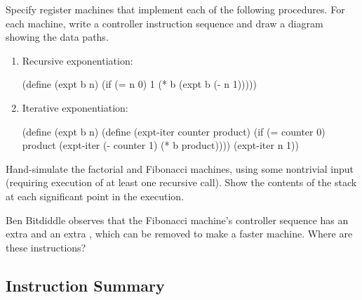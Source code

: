 \begin{exercise}
	\label{Exercise 5.4}
	Specify register machines that implement each of the following procedures.
	For each machine, write a controller instruction sequence and draw a diagram showing the data paths.
	\begin{enumerate}[label = \alph*., leftmargin = *]

		\item
			Recursive exponentiation:

			\begin{scheme}
			  (define (expt b n)
			    (if (= n 0)
			        1
			        (* b (expt b (- n 1)))))
			\end{scheme}

		\item
			Iterative exponentiation:

			\begin{scheme}
			  (define (expt b n)
			    (define (expt-iter counter product)
			      (if (= counter 0)
			          product
			          (expt-iter (- counter 1)
			                     (* b product))))
			    (expt-iter n 1))
			\end{scheme}

	\end{enumerate}
\end{exercise}



\begin{exercise}
	\label{Exercise 5.5}
	Hand-simulate the factorial and Fibonacci machines, using some nontrivial input (requiring execution of at least one recursive call).
	Show the contents of the stack at each significant point in the execution.
\end{exercise}



\begin{exercise}
	\label{Exercise 5.6}
	Ben Bitdiddle observes that the Fibonacci machine’s controller sequence has an extra  and an extra , which can be removed to make a faster machine.
	Where are these instructions?
\end{exercise}



\subsection{Instruction Summary}
\label{Section 5.1.5}

